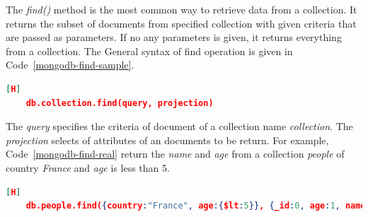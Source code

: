 The \textit{find()} method is the most common way to retrieve data from a collection. It returns the subset of documents from specified collection with given criteria that are passed as parameters. If no any parameters is given, it returns everything from a collection.  The General syntax of find operation is given in Code~\ref{mongodb-find-sample}.
\begin{lstlisting}[language=JSON,caption=\textit{find} in MongoDB, label=mongodb-find-sample][H]
    db.collection.find(query, projection) 
\end{lstlisting}
 The \textit{query} specifies the criteria of document of a collection name \textit{collection}. The \textit{projection} selects of attributes of an documents to be return. For example, Code~\ref{mongodb-find-real} return the \textit{name} and \textit{age} from a collection  \textit{people} of country \textit{France} and \textit{age} is less than 5. 
\begin{lstlisting}[language=JSON,caption=\textit{find()} with query and project, label=mongodb-find-real][H]
    db.people.find({country:"France", age:{$lt:5}}, {_id:0, age:1, name:1}) 

\end{lstlisting}

\par
